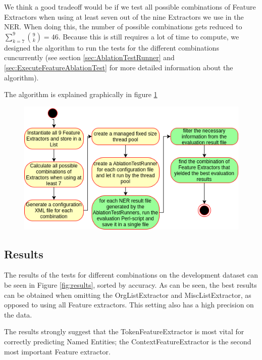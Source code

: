 \documentclass[11pt, english]{article}
\begin{document}
We think a good tradeoff would be if we test all possible combinations of Feature Extractors when using at least seven out of the nine Extractors we use in the NER. When doing this, the number of possible combinations gets reduced to $\sum_{k=7}^{9}\binom{9}{k} = 46$. Because this is still requires a lot of time to compute, we designed the algorithm to run the tests for the different combinations cuncurrently (see section \ref{sec:AblationTestRunner} and \ref{sec:ExecuteFeatureAblationTest} for more detailed information about the algorithm).

The algorithm is explained graphically in figure \ref{fig:AblationAlgo}

\begin{figure}
    \centering
    \includegraphics[scale=0.75]{gfx/ablationAlgo.png}
    \label{fig:AblationAlgo}
\end{figure}

\subsection{Results}
\label{sec:AblationResult}
The results of the tests for different combinations on the development dataset can be seen in Figure \ref{fig:results}, sorted by accuracy.
As can be seen, the best results can be obtained when omitting the OrgListExtractor and MiscListExtractor, as opposed to using all Feature extractors.
This setting also has a high precision on the data.

The results strongly suggest that the TokenFeatureExtractor is most vital for correctly predicting Named Entities; the ContextFeatureExtractor is the second most important Feature extractor.
\end{document}
